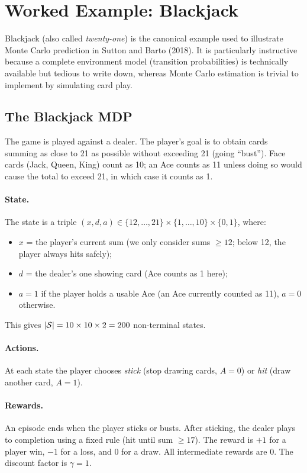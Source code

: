 \section{Worked Example: Blackjack}
\label{sec:mc-blackjack}

Blackjack (also called \emph{twenty-one}) is the canonical example used to illustrate Monte Carlo prediction in Sutton and Barto (2018).  It is particularly instructive because a complete environment model (transition probabilities) is technically available but tedious to write down, whereas Monte Carlo estimation is trivial to implement by simulating card play.

\subsection*{The Blackjack MDP}

The game is played against a dealer.  The player's goal is to obtain cards summing as close to 21 as possible without exceeding 21 (going ``bust'').  Face cards (Jack, Queen, King) count as 10; an Ace counts as 11 unless doing so would cause the total to exceed 21, in which case it counts as 1.

\paragraph{State.}  The state is a triple $(x, d, a) \in \{12,\dots,21\} \times \{1,\dots,10\} \times \{0,1\}$, where:
\begin{itemize}[leftmargin=*]
  \item $x$ = the player's current sum (we only consider sums $\ge 12$; below 12, the player always hits safely);
  \item $d$ = the dealer's one showing card (Ace counts as 1 here);
  \item $a = 1$ if the player holds a usable Ace (an Ace currently counted as 11), $a = 0$ otherwise.
\end{itemize}
This gives $|\mathcal{S}| = 10 \times 10 \times 2 = 200$ non-terminal states.

\paragraph{Actions.}  At each state the player chooses \emph{stick} (stop drawing cards, $A=0$) or \emph{hit} (draw another card, $A=1$).

\paragraph{Rewards.}  An episode ends when the player sticks or busts.  After sticking, the dealer plays to completion using a fixed rule (hit until sum $\ge 17$).  The reward is $+1$ for a player win, $-1$ for a loss, and $0$ for a draw.  All intermediate rewards are $0$.  The discount factor is $\gamma = 1$.

